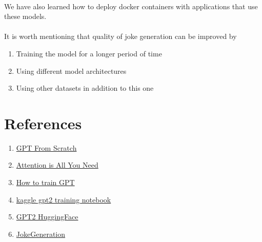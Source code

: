 \documentclass[12pt]{article}
\begin{document}
\paragraph{}
We have also learned how to deploy docker containers with applications that use these models.

\paragraph{}
It is worth mentioning that quality of joke generation can be improved by
\begin{enumerate}
    \item Training the model for a longer period of time
    \item Using different model architectures
    \item Using other datasets in addition to this one
\end{enumerate}

\section{References}
\begin{enumerate}
    \item \href{https://www.youtube.com/watch?v=kCc8FmEb1nY&t=1694s}{GPT From Scratch}
    \item \href{https://arxiv.org/abs/1706.03762}{Attention is All You Need}
    \item \href{https://habr.com/ru/companies/neoflex/articles/722584/}{How to train GPT}
    \item \href{https://www.kaggle.com/code/suraj520/pytorch-train-gpt2-and-generate-text-from-it}{kaggle gpt2 training notebook}
    \item \href{https://huggingface.co/gpt2}{GPT2 HuggingFace}
    \item \href{https://github.com/Maves1/IU_NLP_Joke_Generator/tree/main}{JokeGeneration}
\end{enumerate}
\end{document}
